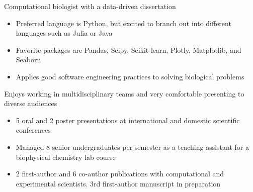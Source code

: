 

\begin{cventries}
\vspace{-4.0mm}

  \cventry
    {} %
    {} %
    {} %
    {} %
    {
      \begin{cvitems} %
        \item {Computational biologist with a data-driven dissertation}
        \begin{itemize}
       	 	\item Preferred language is Python, but excited to branch out into different languages such as Julia or Java
       	 	\item Favorite packages are Pandas, Scipy, Scikit-learn, Plotly, Matplotlib, and Seaborn
       	 	\item Applies good software engineering practices to solving biological problems 
        \end{itemize}
        \vspace{1.0mm}
        \item {Enjoys working in multidisciplinary teams and very comfortable presenting to diverse audiences}
        \begin{itemize}
         	\item 5 oral and 2 poster presentations at international and domestic scientific conferences
         	\item Managed 8 senior undergraduates per semester as a teaching assistant for a biophysical chemistry lab course
         	\item 2 first-author and 6 co-author publications with computational and experimental scientists. 3rd first-author manuscript in preparation
        \end{itemize}
      \end{cvitems}
    }
\vspace{-4.0mm}
\end{cventries}
